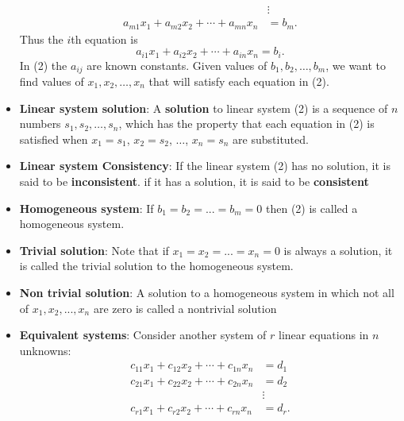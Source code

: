 \documentclass{report}
\begin{document}
\begin{itemize}
\[\begin{aligned}
                                                               &\vdots \\
                    a_{m1}x_1 + a_{m2}x_2 + \cdots + a_{mn}x_n &= b_m.
                \end{aligned}
                \tag{2}
            \]
            \bigbreak \noindent 
            Thus the \(i\)th equation is
            \[
                a_{i1}x_1 + a_{i2}x_2 + \cdots + a_{in}x_n = b_i.
            \]
            \bigbreak \noindent 
            In (2) the \(a_{ij}\) are known constants. Given values of \(b_1, b_2, \ldots, b_m\), we want to find values of \(x_1, x_2, \ldots, x_n\) that will satisfy each equation in (2).
        \item \textbf{Linear system solution}:
            A \textbf{solution} to linear system (2) is a sequence of \(n\) numbers \(s_1, s_2, \ldots, s_n\), which has the property that each equation in (2) is satisfied when \(x_1 = s_1\), \(x_2 = s_2\), \(\ldots\), \(x_n = s_n\) are substituted.
        \item \textbf{Linear system Consistency}: If the linear system (2) has no solution, it is said to be \textbf{inconsistent}. if it has a solution, it is said to be \textbf{consistent}
        \item \textbf{Homogeneous system}: If $b_{1} = b_{2} = ... = b_{m} = 0 $ then (2) is called a homogeneous system.
        \item \textbf{Trivial solution}: Note that if $x_{1} = x_{2} = ... = x_{n} = 0$ is always a solution, it is called the trivial solution to the homogeneous system.
        \item \textbf{Non trivial solution}:  A solution to a homogeneous system in which not all of $x_{1}, x_{2}, ..., x_{n}$ are zero is called a nontrivial solution
        \item \textbf{Equivalent systems}:
            \noindent Consider another system of \(r\) linear equations in \(n\) unknowns:
            \[
                \begin{aligned}
                    c_{11}x_1 + c_{12}x_2 + \cdots + c_{1n}x_n &= d_1 \\
                    c_{21}x_1 + c_{22}x_2 + \cdots + c_{2n}x_n &= d_2 \\
                                                               &\vdots \\
                    c_{r1}x_1 + c_{r2}x_2 + \cdots + c_{rn}x_n &= d_r.
                \end{aligned}
                \tag{3}
\]
\end{itemize}
\end{document}
